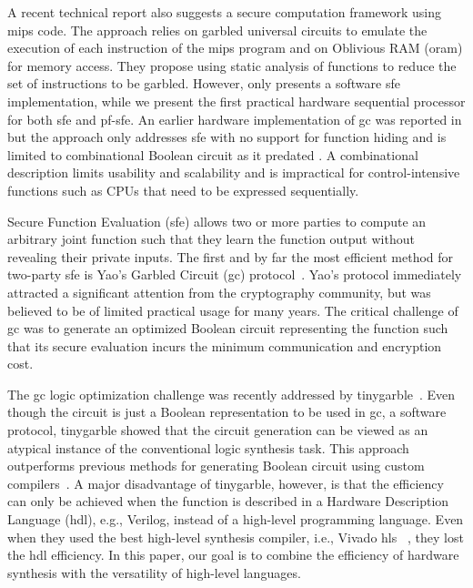 A recent technical report \cite{wang2016secure} also suggests a secure computation framework using \gls{mips} code. The approach relies on garbled universal circuits to emulate the execution of each instruction of the \gls{mips} program and on Oblivious RAM (\acrshort{oram}) for memory access. They propose using static analysis of functions to reduce the set of instructions to be garbled. However, \cite{wang2016secure} only presents a software \acrshort{sfe} implementation, while we present the first practical hardware sequential processor for both \acrshort{sfe} and \acrshort{pf-sfe}. An earlier hardware implementation of \acrshort{gc} was reported in \cite{jarvinen2010garbled} but the approach only addresses \acrshort{sfe} with no support for function hiding and is limited to combinational Boolean circuit as it predated \cite{songhori2015tinygarble}. A combinational description limits usability and scalability and is impractical for control-intensive functions such as CPUs that need to be expressed sequentially.


Secure Function Evaluation (\acrshort{sfe}) allows two or more parties to compute an arbitrary joint function such that they learn the function output without revealing their private inputs.
The first and by far the most efficient method for two-party \acrshort{sfe} is Yao's Garbled Circuit (\acrshort{gc}) protocol~\cite{yao1986generate}.
Yao's protocol immediately attracted a significant attention from the cryptography community, but was believed to be of limited practical usage for many years.
The critical challenge of \acrshort{gc} was to generate an optimized Boolean circuit representing the function such that its secure evaluation incurs the minimum communication and encryption cost.

The \acrshort{gc} logic optimization challenge was recently addressed by \gls{tinygarble}~\cite{songhori2015tinygarble}.
Even though the circuit is just a Boolean representation to be used in \acrshort{gc}, a software protocol, \gls{tinygarble} showed that the circuit generation can be viewed as an atypical instance of the conventional logic synthesis task.
This approach outperforms previous methods for generating Boolean circuit using custom compilers~\cite{malkhi2004fairplay,holzer2012secure, rastogi2014wysteria,demmler2015aby,liu2015oblivm,mood2016frigate}.
A major disadvantage of \gls{tinygarble}, however, is that the efficiency can only be achieved when the function is described in a Hardware Description Language (\acrshort{hdl}), e.g., Verilog, instead of a high-level programming language.
Even when they used the best high-level synthesis compiler, i.e., Vivado \acrshort{hls} ~\cite{tool:Vivado}, they lost the \acrshort{hdl} efficiency.
In this paper, our goal is to combine the efficiency of hardware synthesis with the versatility of high-level languages.

